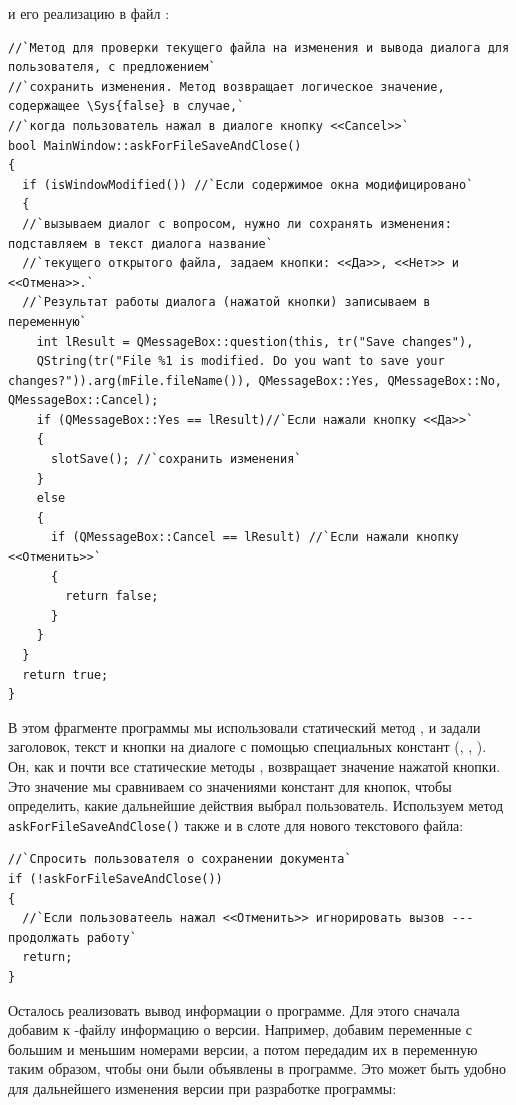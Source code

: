 и его реализацию в файл  :
\begin{lstlisting}
//`Метод для проверки текущего файла на изменения и вывода диалога для пользователя, с предложением` 
//`сохранить изменения. Метод возвращает логическое значение, содержащее \Sys{false} в случае,` 
//`когда пользователь нажал в диалоге кнопку <<Cancel>>` 
bool MainWindow::askForFileSaveAndClose()
{
  if (isWindowModified()) //`Если содержимое окна модифицировано`
  {
  //`вызываем диалог с вопросом, нужно ли сохранять изменения: подставляем в текст диалога название`
  //`текущего открытого файла, задаем кнопки: <<Да>>, <<Нет>> и <<Отмена>>.`
  //`Результат работы диалога (нажатой кнопки) записываем в переменную`
    int lResult = QMessageBox::question(this, tr("Save changes"),
    QString(tr("File %1 is modified. Do you want to save your changes?")).arg(mFile.fileName()), QMessageBox::Yes, QMessageBox::No, QMessageBox::Cancel);
    if (QMessageBox::Yes == lResult)//`Если нажали кнопку <<Да>>`
    {
      slotSave(); //`сохранить изменения` 
    }
    else
    {
      if (QMessageBox::Cancel == lResult) //`Если нажали кнопку <<Отменить>>`
      {
        return false;
      }
    }
  }
  return true;
}
\end{lstlisting}

В этом фрагменте программы мы использовали статический 
метод , и задали
заголовок, текст и кнопки на диалоге с помощью специальных констант (,
 , ). Он, как и почти все статические 
методы , возвращает значение нажатой кнопки. Это
значение мы сравниваем со значениями констант для кнопок, чтобы определить, 
какие дальнейшие действия выбрал
пользователь. Используем метод \lstinline!askForFileSaveAndClose()! 
также и в слоте для нового текстового файла: 
\begin{lstlisting}
//`Спросить пользователя о сохранении документа`
if (!askForFileSaveAndClose())
{
  //`Если пользоватеель нажал <<Отменить>> игнорировать вызов --- продолжать работу` 
  return;
}
\end{lstlisting}

Осталось реализовать вывод информации о программе. Для этого сначала добавим к
-файлу информацию о версии. Например, добавим переменные с большим и меньшим
номерами версии, а потом передадим их в переменную  
таким образом, чтобы они
были объявлены в программе. Это может быть удобно для дальнейшего изменения версии 
при разработке программы: 

